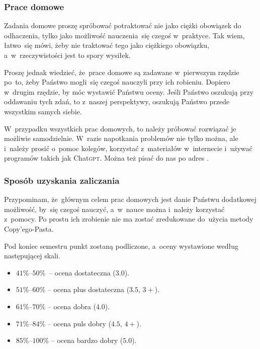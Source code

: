 \documentclass[10pt,t]{beamer}
\begin{document}
\begin{frame}
  \frametitle{Prace domowe}


  Zadania domowe proszę \alert{spróbować} potraktować nie jako ciężki
  obowiązek do odhaczenia, tylko jako możliwość nauczenia~się czegoś
  w~praktyce. Tak wiem, łatwo~się mówi, żeby nie traktować tego jako
  ciężkiego obowiązku, a~w~rzeczywistości jest to spory wysiłek.

  Proszę jednak wiedzieć, że~prace domowe są zadawane w~pierwszym rzędzie
  po~to, żeby Państwo mogli~się czegoś nauczyli przy ich robieniu. Dopiero
  w~drugim rzędzie, by móc wystawić Państwu oceny. Jeśli Państwo oszukują
  przy oddawaniu tych zdań, to z~naszej perspektywy, oszukują Państwo przede
  wszystkim samych siebie.

  W~przypadku wszystkich prac domowych, to należy próbować rozwiązać je
  możliwie samodzielnie. W~razie napotkania problemów nie tylko można,
  ale i~\alert{należy} prosić o~pomoc kolegów, korzystać z~materiałów
  w~internecie i~używać programów takich jak Chat\textsc{gpt}. Można też
  pisać do nas po adres \email.

\end{frame}





\begin{frame}
  \frametitle{Sposób uzyskania zaliczania}


  Przypominam, że~głównym celem prac domowych jest danie Państwu dodatkowej
  możliwość, by~się czegoś nauczyć, a~w~nauce można i~\alert{należy}
  korzystać z~pomocy. Po prostu ich zrobienie nie ma zostać zredukowane
  do~użycia metody Copy’ego-Pasta.

  Pod koniec semestru punkt zostaną podliczone, a~oceny wystawione według
  następującej skali.

  \begin{itemize}

  \item $41\%\text{--}50\%$~-- ocena dostateczna ($3.0$).

  \item $51\%\text{--}60\%$ -- ocena plus dostateczna ($3.5$, $3+$).

  \item $61\%\text{--}70\%$ -- ocena dobra ($4.0$).

  \item $71\%\text{--}84\%$ -- ocena puls dobry ($4.5$, $4+$).

  \item $85\%\text{--}100\%$ -- ocena bardzo dobry ($5.0$).

  \end{itemize}

\end{frame}
\end{document}
